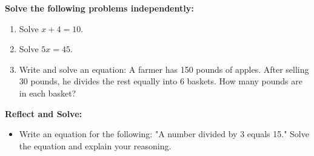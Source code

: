 \documentclass[12pt]{article}
\begin{document}
\begin{tcolorbox}[colframe=black!60, colback=white, 
coltitle=black, colbacktitle=black!15, fonttitle=\bfseries\Large, 
title=Independent Practice, halign title=center, left=10pt, right=10pt, top=10pt, bottom=45pt]
\textbf{Solve the following problems independently:}
\begin{enumerate}[itemsep=3em]
    \item Solve \( x + 4 = 10 \). 
    \item Solve \( 5x = 45 \). 
    \item Write and solve an equation: A farmer has 150 pounds of apples. After selling 30 pounds, he divides the rest equally into 6 baskets. How many pounds are in each basket? 
\end{enumerate}
\end{tcolorbox}

\begin{tcolorbox}[colframe=black!60, colback=white, 
coltitle=black, colbacktitle=black!15, fonttitle=\bfseries\Large, 
title=Exit Ticket, halign title=center, left=10pt, right=10pt, top=10pt, bottom=110pt]
\textbf{Reflect and Solve:}
\begin{itemize}
    \item Write an equation for the following: "A number divided by 3 equals 15." Solve the equation and explain your reasoning.
\end{itemize}
\end{tcolorbox}
\end{document}
